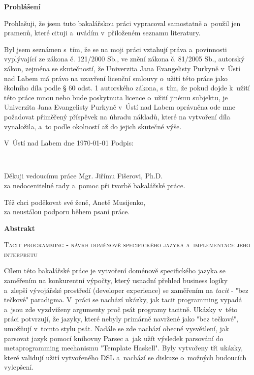\documentclass[male, czech]{kithesis}
\newcommand{\TITULcz}{Tacit programming - návrh doménově specifického jazyka a~implementace jeho interpretu} %
\begin{document}

\textbf{Prohlášení}

Prohlašuji, že jsem tuto bakalářskou práci vypracoval samostatně a~použil
jen pramenů, které cituji a~uvádím v~přiloženém seznamu literatury.

\vspace{1em}
Byl jsem seznámen s~tím, že se na moji práci vztahují práva a~povinnosti vyplývající ze zákona č. 121/2000 Sb., ve znění zákona č. 81/2005 Sb., autorský zákon, zejména se skutečností, že Univerzita Jana Evangelisty Purkyně v~Ústí nad Labem má právo na uzavření licenční smlouvy o~užití této práce jako školního díla podle § 60 odst. 1 autorského zákona, s~tím, že pokud dojde k~užití této práce mnou nebo bude poskytnuta licence o~užití jinému
subjektu, je Univerzita Jana Evangelisty Purkyně v~Ústí nad Labem oprávněna ode mne požadovat přiměřený příspěvek na úhradu nákladů, které na vytvoření díla vynaložila, a~to podle okolností až do jejich skutečné výše.

\vspace{1em}
V~Ústí nad Labem dne \today \hspace{0.3\textwidth} Podpis:


\clearpage
\thispagestyle{empty}
~\vfill

\begin{flushright}
  Děkuji vedoucímu práce Mgr. Jiřímu Fišerovi, Ph.D.\\ za nedocenitelné rady a~pomoc při tvorbě bakalářské práce.

  Též chci poděkovat své ženě, Anetě Musijenko, \\ za neustálou podporu během psaní práce.
\end{flushright}

\cleardoublepage
\thispagestyle{empty}

\textbf{\textsf{Abstrakt}}

\textsc{\TITULcz}

Cílem této bakalářské práce je vytvoření doménově specifického jazyka se zaměřením na konkurentní výpočty, 
který usnadní přehled business logiky a~zlepší vývojářské prostředí (developer experience) se zaměřením na \textit{tacit} - "bez tečkové" paradigma.
V~práci se nachází ukázky, 
jak tacit programming vypadá
a~jsou zde vyzdviženy argumenty proč psát programy tacitně.
Ukázky v~této práci potvrzují, 
že jazyky, 
které nebyly primárně navržené jako "bez tečkové", 
umožňují v~tomto stylu psát.
Nadále se zde nachází obecné vysvětlení, 
jak parsovat jazyk pomocí knihovny Parsec
a~jak užít výsledek parsování do metaprogramming mechanismu "Template Haskell".
Byly vytvořeny tři ukázky, 
které validují užití vytvořeného DSL
a~nachází se diskuze o~možných budoucích vylepšení.
\end{document}
